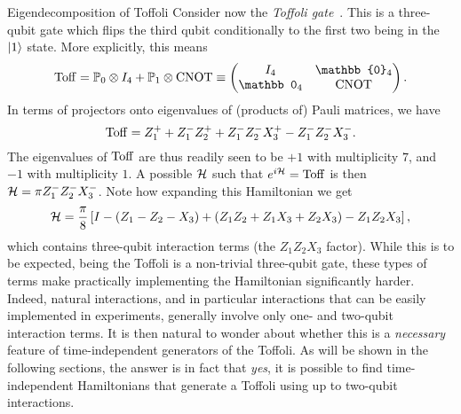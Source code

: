 \begin{examplebox}[label={ex:GL:eigendecomposition_Toffoli}]{Eigendecomposition of Toffoli}
Consider now the \emph{Toffoli gate}~\cite{shi2002both,lanyon2008simplifying,monz2009realization,fedorov2011implementation,shi2018deutsch}. This is a three-qubit gate which flips the third qubit conditionally to the first two being in the $\ket1$ state.
More explicitly, this means
\begin{equation}
    \Toff =
    \PP_0\otimes I_4 + \PP_1\otimes\CNOT
    \equiv
    \begin{pmatrix}
        I_4 & \mathbb{0}_4 \\
        \mathbb 0_4 & \CNOT
    \end{pmatrix}.
\end{equation}
In terms of projectors onto eigenvalues of (products of) Pauli matrices, we have
\begin{equation}
    \operatorname{Toff} = Z_1^+ + Z_1^- Z_2^+ + Z_1^- Z_2^- X_3^+ - Z_1^- Z_2^- X_3^-.
\end{equation}
The eigenvalues of $\operatorname{Toff}$ are thus readily seen to be $+1$ with multiplicity $7$, and $-1$ with multiplicity $1$.
A possible ${\mathcal{H}}$ such that $e^{i{\mathcal{H}}}=\operatorname{Toff}$ is then ${\mathcal{H}}=\pi Z_1^- Z_2^- X_3^-$.
Note how expanding this Hamiltonian we get
\begin{equation}
    {\mathcal{H}} = \frac{\pi}{8}\left[
        I - (Z_1 - Z_2 - X_3)
        + (Z_1 Z_2 + Z_1 X_3 + Z_2 X_3)
        - Z_1 Z_2 X_3
    \right],
\end{equation}
which contains three-qubit interaction terms (the $Z_1 Z_2 X_3$ factor). While this is to be expected, being the Toffoli is a non-trivial three-qubit gate, these types of terms make practically implementing the Hamiltonian significantly harder.
Indeed, natural interactions, and in particular interactions that can be easily implemented in experiments, generally involve only one- and two-qubit interaction terms.
It is then natural to wonder about whether this is a \emph{necessary} feature of time-independent generators of the Toffoli.
As will be shown in the following sections, the answer is in fact that \emph{yes}, it is possible to find time-independent Hamiltonians that generate a Toffoli using up to two-qubit interactions.
\end{examplebox}

